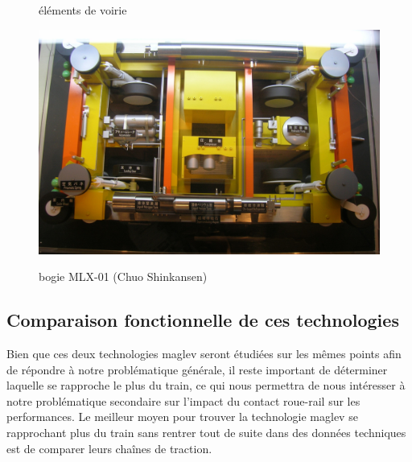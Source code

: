 \documentclass[12pt, a4paper, onecolumn]{article}
\renewcommand{\tab}{\tabto{15px}}
\begin{document}
\begin{figure}[H]
\begin{minipage}{.48\linewidth}
    \caption{éléments de voirie}
    \label{schemaEDS}
    \includegraphics[width=\textwidth]{img/bogieLSM.jpg}
    \caption{bogie MLX-01 (Chuo Shinkansen)}
    \label{bogieLSM}
  \end{minipage}
\end{figure}



\pagebreak %
\subsection*{Comparaison fonctionnelle de ces technologies}

\tab Bien que ces deux technologies maglev seront étudiées sur les mêmes points afin de répondre à notre problématique générale, il reste important de déterminer laquelle se rapproche le plus du train, ce qui nous permettra de nous intéresser à notre problématique secondaire sur l'impact du contact roue-rail sur les performances.
Le meilleur moyen pour trouver la technologie maglev se rapprochant plus du train sans rentrer tout de suite dans des données techniques est de comparer leurs chaînes de traction. \\
\end{document}
